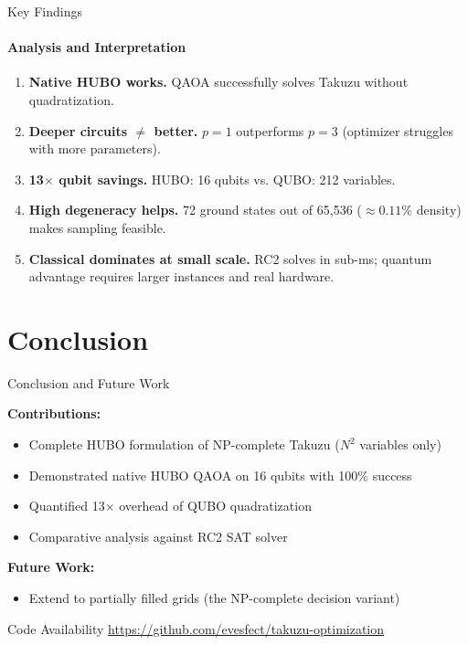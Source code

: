 \documentclass[aspectratio=169, t]{beamer}
\begin{document}
\begin{frame}{Key Findings}
\framesubtitle{Analysis and Interpretation}

\begin{enumerate}
    \item \textbf{Native HUBO works.} QAOA successfully solves Takuzu without quadratization.
    
    \bigskip
    \item \textbf{Deeper circuits $\neq$ better.} $p=1$ outperforms $p=3$ (optimizer struggles with more parameters).
    
    \bigskip
    \item \textbf{13$\times$ qubit savings.} HUBO: 16 qubits vs. QUBO: 212 variables.
    
    \bigskip
    \item \textbf{High degeneracy helps.} 72 ground states out of 65,536 ($\approx 0.11\%$ density) makes sampling feasible.
    
    \bigskip
    \item \textbf{Classical dominates at small scale.} RC2 solves in sub-ms; quantum advantage requires larger instances and real hardware.
\end{enumerate}
\end{frame}

\section{Conclusion}

\begin{frame}{Conclusion and Future Work}

\textbf{Contributions:}
\begin{itemize}
    \item Complete HUBO formulation of NP-complete Takuzu ($N^2$ variables only)
    \item Demonstrated native HUBO QAOA on 16 qubits with 100\% success
    \item Quantified 13$\times$ overhead of QUBO quadratization
    \item Comparative analysis against RC2 SAT solver
\end{itemize}

\bigskip
\textbf{Future Work:}
\begin{itemize}
    \item Extend to partially filled grids (the NP-complete decision variant)
\end{itemize}

\bigskip
\begin{exampleblock}{Code Availability}
\url{https://github.com/evesfect/takuzu-optimization}
\end{exampleblock}
\end{frame}
\end{document}

